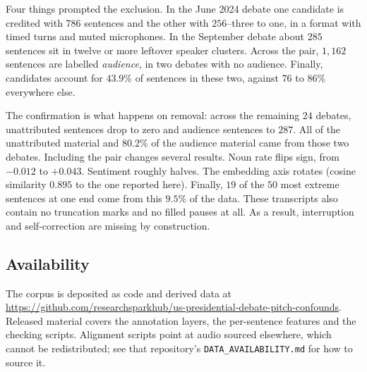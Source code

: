 \documentclass[pdflatex,sn-apa]{sn-jnl}%
\begin{document}
Four things prompted the exclusion. In the June 2024 debate one candidate is
credited with $786$ sentences and the other with $256$--three to one, in a
format with timed turns and muted microphones. In the September debate about
$285$ sentences sit in twelve or more leftover speaker clusters. Across the
pair, $1{,}162$ sentences are labelled \emph{audience}, in two debates with no
audience. Finally, candidates account for $43.9\%$ of sentences in these
two, against $76$ to $86\%$ everywhere else.

The confirmation is what happens on removal: across the remaining $24$
debates, unattributed sentences drop to zero and audience sentences to $287$.
All of the unattributed material and $80.2\%$ of the audience material came
from those two debates. Including the pair changes several results. Noun
rate flips sign, from $-0.012$ to $+0.043$. Sentiment roughly halves. The
embedding axis rotates (cosine similarity $0.895$ to the one reported
here). Finally, $19$ of the $50$ most extreme sentences at one end come
from this $9.5\%$ of the data. These transcripts also contain no
truncation marks and no filled pauses at all. As a result, interruption
and self-correction are missing by construction.

\subsection*{Availability}
The corpus is deposited as code and derived data at
\url{https://github.com/researchsparkhub/us-presidential-debate-pitch-confounds}.
Released material covers the annotation layers, the per-sentence features
and the checking scripts. Alignment scripts point at audio sourced
elsewhere, which cannot be redistributed; see that repository's
\texttt{DATA\_AVAILABILITY.md} for how to source it.
\label{s:resource}


\end{document}
